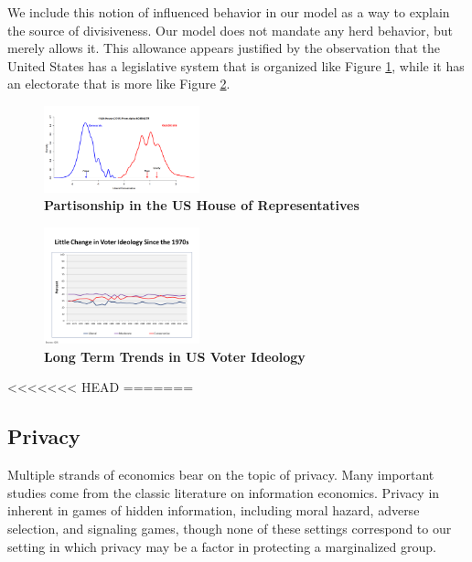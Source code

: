 We include this notion of influenced behavior in our model as a way to explain the source of divisiveness.  Our model does not mandate any herd behavior, but merely allows it.  This allowance appears justified by the observation that the United States has a legislative system that is organized like Figure \ref{fig:partisonship}, while it has an electorate that is more like Figure \ref{fig:voters}.


\begin{figure}[htbp]
\begin{center}
\includegraphics[width=0.4\textwidth]{figs/alpha_House_114_Histogram_8_January_2016}
\caption{{\bf Partisonship in the US House of Representatives}}
\label{fig:partisonship}
\end{center}
\end{figure}




\begin{figure}[htbp]
\begin{center}
\includegraphics[width=0.4\textwidth]{figs/polarization2}
\caption{{\bf Long Term Trends in US Voter Ideology}}
\label{fig:voters}
\end{center}
\end{figure}

<<<<<<< HEAD
%
%
%
%
=======

\subsection{Privacy}

Multiple strands of economics bear on the topic of privacy.  Many important studies come from the classic literature on information economics.  Privacy in inherent in games of hidden information, including moral hazard, adverse selection, and signaling games, though none of these settings correspond to our setting in which privacy may be a factor in protecting a marginalized group.

